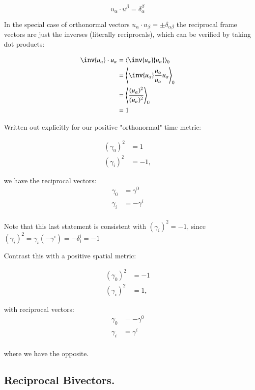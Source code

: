\begin{equation*}
u_{\alpha} \cdot u^{\beta} = \delta_{\alpha}^\beta
\end{equation*}

In the special case of orthonormal vectors $u_{\alpha} \cdot u_{\beta} = \pm \delta_{\alpha\beta}$ the reciprocal frame vectors
are just the inverses (literally reciprocals), which can be verified by taking dot products:

\begin{align*}
\inv{u_{\alpha}} \cdot {u_{\alpha}}
&= \gpgradezero{ \inv{u_{\alpha}} {u_{\alpha}} } \\
&= \gpgradezero{ \inv{u_{\alpha}} \frac{u_{\alpha}}{u_{\alpha}} {u_{\alpha}} } \\
&= \gpgradezero{ \frac{(u_{\alpha})^2}{(u_{\alpha})^2} } \\
&= 1
\end{align*}

Written out explicitly for our positive "orthonormal" time metric:

\begin{align*}
(\gamma_0)^2 &= 1 \\
(\gamma_i)^2 &= -1,
\end{align*}

we have the reciprocal vectors:
\begin{align*}
\gamma_0 &= \gamma^0 \\
\gamma_i &= -\gamma^i \\
\end{align*}

Note that this last statement is consistent with $(\gamma_i)^2 = -1$, since $(\gamma_i)^2 = \gamma_i (-\gamma^i) = -\delta_i^i = -1$

Contrast this with a positive spatial metric:

\begin{align*}
(\gamma_0)^2 &= -1 \\
(\gamma_i)^2 &= 1,
\end{align*}

with reciprocal vectors:
\begin{align*}
\gamma_0 &= -\gamma^0 \\
\gamma_i &= \gamma^i \\
\end{align*}

where we have the opposite.

\subsection{Reciprocal Bivectors. }

